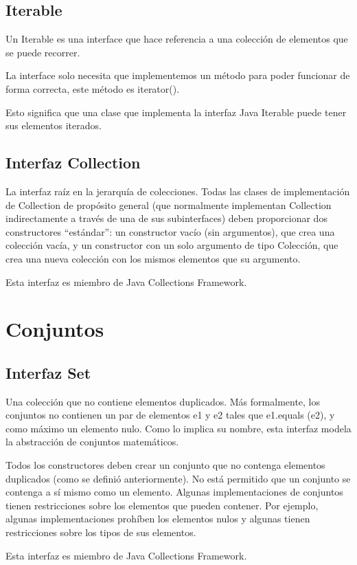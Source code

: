 \documentclass[11pt]{article}
\begin{document}
\subsection{Iterable}
\par
Un Iterable es una interface que hace referencia a una colección de 
elementos que se puede recorrer.
\par
La interface solo necesita que implementemos un método para poder 
funcionar de forma correcta, este método es iterator().
\par
Esto significa que una clase que implementa la interfaz Java Iterable 
puede tener sus elementos iterados. 

\subsection{Interfaz Collection}
\par
La interfaz raíz en la jerarquía de colecciones. Todas las clases de 
implementación de Collection de propósito general (que normalmente 
implementan Collection indirectamente a través de una de sus 
subinterfaces) deben proporcionar dos constructores ``estándar'': un 
constructor vacío (sin argumentos), que crea una colección vacía, y 
un constructor con un solo argumento de tipo Colección, que crea una 
nueva colección con los mismos elementos que su argumento. 

\par
Esta interfaz es miembro de Java Collections Framework.


\section{Conjuntos}

\subsection{Interfaz Set}
\par
Una colección que no contiene elementos duplicados. Más formalmente, 
los conjuntos no contienen un par de elementos e1 y e2 tales que 
e1.equals (e2), y como máximo un elemento nulo. Como lo implica su 
nombre, esta interfaz modela la abstracción de conjuntos matemáticos.
\par
Todos los constructores deben crear un conjunto que no contenga 
elementos duplicados (como se definió anteriormente). No está 
permitido que un conjunto se contenga a sí mismo como un elemento. 
Algunas implementaciones de conjuntos tienen restricciones sobre los 
elementos que pueden contener. Por ejemplo, algunas implementaciones 
prohíben los elementos nulos y algunas tienen restricciones sobre los 
tipos de sus elementos.
\par
Esta interfaz es miembro de Java Collections Framework.
\end{document}
